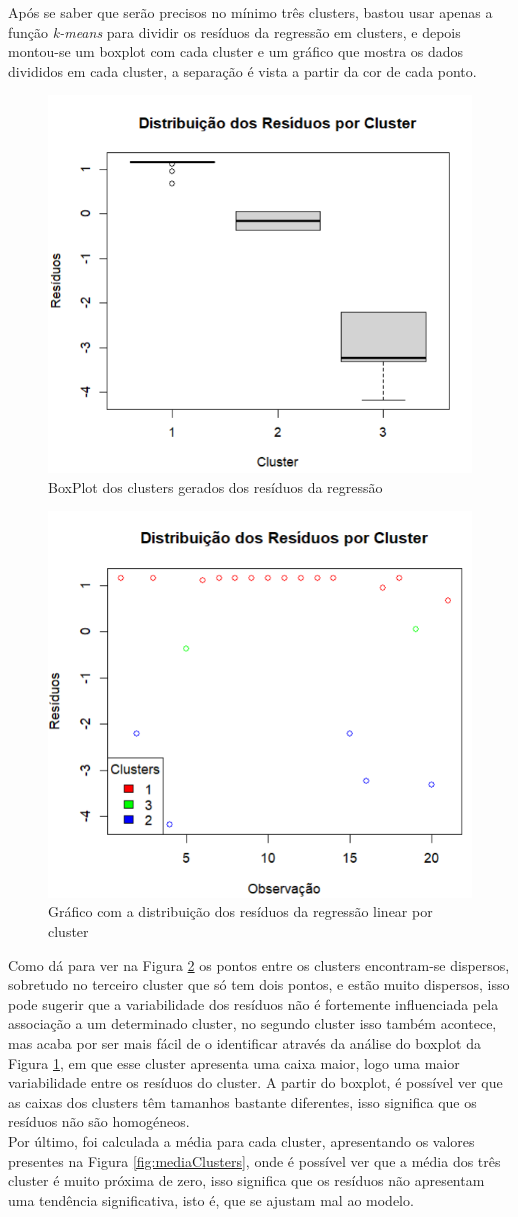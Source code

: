 \documentclass[%
 aip,
cp,  %
 amsmath,amssymb,%
 reprint,%
]{revtex4-2}
\begin{document}
Após se saber que serão precisos no mínimo três clusters, bastou usar apenas a função \textit{k-means} para dividir os resíduos da regressão em clusters, e depois montou-se um boxplot com cada cluster e um gráfico que mostra os dados divididos em cada cluster, a separação é vista a partir da cor de cada ponto.

\begin{figure}[!h]
    \centering
    \includegraphics[width=0.4\linewidth]{imagens//questao4/boxplotK-means.png}
    \caption{BoxPlot dos clusters gerados dos resíduos da regressão}
    \label{fig:boxPlotK-means}
\end{figure}


\begin{figure}[!h]
    \centering
    \includegraphics[width=0.4\linewidth]{imagens//questao4/plotClusters.png}
    \caption{Gráfico com a distribuição dos resíduos da regressão linear por cluster}
    \label{fig:plotClusters}
\end{figure}

Como dá para ver na Figura \ref{fig:plotClusters} os pontos entre os clusters encontram-se dispersos, sobretudo no terceiro cluster que só tem dois pontos, e estão muito dispersos, isso pode sugerir que a variabilidade dos resíduos não é fortemente influenciada pela associação a um determinado cluster, no segundo cluster isso também acontece, mas acaba por ser mais fácil de o identificar através da análise do boxplot da Figura \ref{fig:boxPlotK-means}, em que esse cluster apresenta uma caixa maior, logo uma maior variabilidade entre os resíduos do cluster. A partir do boxplot, é possível ver que as caixas dos clusters têm tamanhos bastante diferentes, isso significa que os resíduos não são homogéneos.
\\
Por último, foi calculada a média para cada cluster, apresentando os valores presentes na Figura \ref{fig:mediaClusters},  onde é possível ver que a média dos três cluster é muito próxima de zero, isso significa que os resíduos não apresentam uma tendência significativa, isto é, que se ajustam mal ao modelo.
\end{document}
